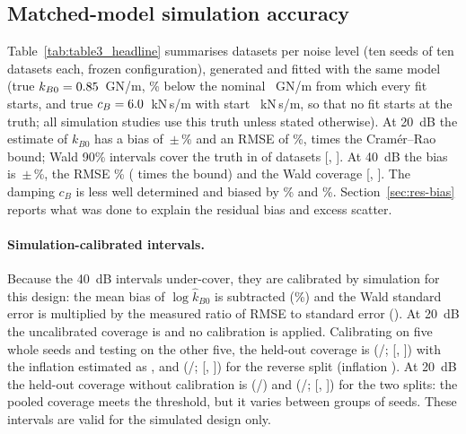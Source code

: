 \subsection{Matched-model simulation accuracy}\label{sec:res-headline}
Table~\ref{tab:table3_headline} summarises \HLN{} datasets per noise level (ten seeds of ten datasets each, frozen
configuration), generated and fitted with the same model (true $k_{B0} = 0.85$~GN/m, \kBtruthBelowPct\%
below the nominal \kBnom~GN/m from which every fit starts, and true $c_B = 6.0$~kN\,s/m with start
\cBstart~kN\,s/m, so that no fit starts at the truth; all simulation studies use this truth unless stated
otherwise). At
20~dB the estimate of $k_{B0}$ has a bias of \HLTwentyBias\,$\pm$\,\HLTwentyBiasSE\% and an RMSE of
\HLTwentyRMSE\%, \HLTwentyRatioCRB{} times the Cram\'er--Rao bound; Wald 90\% intervals cover the truth
in \HLTwentyCov{} of datasets [\HLTwentyCovLo, \HLTwentyCovHi]. At 40~dB the bias is
\HLFortyBias\,$\pm$\,\HLFortyBiasSE\%, the RMSE \HLFortyRMSE\% (\HLFortyRatioCRB{} times the bound)
and the Wald coverage \HLFortyCov{} [\HLFortyCovLo, \HLFortyCovHi]. The damping $c_B$ is less well
determined and biased by \HLTwentycBBias\% and \HLFortycBBias\%. Section~\ref{sec:res-bias} reports
what was done to explain the residual bias and excess scatter.

\paragraph{Simulation-calibrated intervals.} Because the 40~dB intervals under-cover, they are
calibrated by simulation for this design: the mean bias of $\log\hat k_{B0}$ is subtracted
(\CalBiasForty\%) and the Wald standard error is multiplied by the measured ratio of RMSE to standard
error (\CalInflForty). At 20~dB the uncalibrated coverage is \CalTwentyRawCov{} and no calibration is
applied. Calibrating on five whole seeds and testing on the other five, the held-out coverage is
\CalSplitACov{} (\CalSplitAk/\CalSplitAn; [\CalSplitALo, \CalSplitAHi]) with the inflation estimated
as \CalSplitAInfl, and \CalSplitBCov{} (\CalSplitBk/\CalSplitBn; [\CalSplitBLo, \CalSplitBHi]) for the
reverse split (inflation \CalSplitBInfl). At 20~dB the held-out coverage without calibration is
\CalTwentySplitACov{} (\CalTwentySplitAk/\CalTwentySplitAn) and \CalTwentySplitBCov{}
(\CalTwentySplitBk/\CalTwentySplitBn; [\CalTwentySplitBLo, \CalTwentySplitBHi]) for the two splits: the
pooled coverage meets the threshold, but it varies between groups of seeds. These intervals are valid
for the simulated design only.

